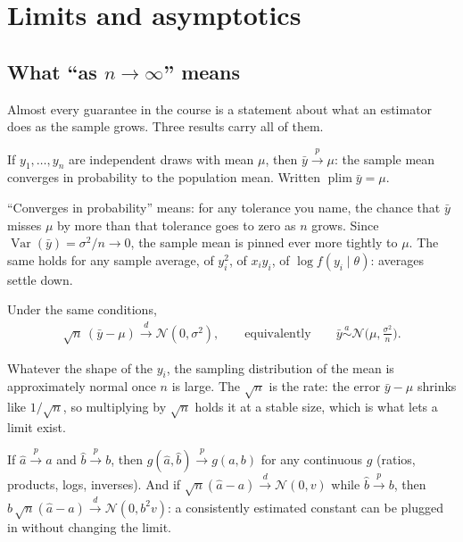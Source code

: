 \documentclass[11pt]{article}
\theoremstyle{definition}
\DeclareMathOperator{\Var}{Var}
\DeclareMathOperator{\plim}{plim}
\newcommand{\dto}{\overset{d}{\longrightarrow}}
\newcommand{\pto}{\overset{p}{\longrightarrow}}
\begin{document}
\section{Limits and asymptotics}
\label{sec:asymp}

\subsection{What ``as $n \to \infty$'' means}

Almost every guarantee in the course is a statement about what an
estimator does as the sample grows. Three results carry all of them.

\begin{rulebox}
If $y_1, \dots, y_n$ are independent draws with mean $\mu$, then
$\bar y \pto \mu$: the sample mean converges in probability to the
population mean. Written $\plim \bar y = \mu$.
\end{rulebox}
``Converges in probability'' means: for any tolerance you name, the chance
that $\bar y$ misses $\mu$ by more than that tolerance goes to zero as $n$
grows. Since $\Var(\bar y) = \sigma^2/n \to 0$, the sample mean is pinned
ever more tightly to $\mu$. The same holds for any sample average, of
$y_i^2$, of $x_iy_i$, of $\log f(y_i \mid \theta)$: averages settle down.

\begin{rulebox}
Under the same conditions,
\begin{align*}
  \sqrt n\,(\bar y - \mu) \dto \mathcal N(0, \sigma^2),
  \qquad\text{equivalently}\qquad
  \bar y \overset{a}{\sim} \mathcal N\!\Big(\mu, \frac{\sigma^2}{n}\Big).
\end{align*}
\end{rulebox}
Whatever the shape of the $y_i$, the sampling distribution of the mean is
approximately normal once $n$ is large. The $\sqrt n$ is the rate: the
error $\bar y - \mu$ shrinks like $1/\sqrt n$, so multiplying by $\sqrt n$
holds it at a stable size, which is what lets a limit exist.

\begin{rulebox}
If $\hat a \pto a$ and $\hat b \pto b$, then $g(\hat a, \hat b) \pto g(a,
b)$ for any continuous $g$ (ratios, products, logs, inverses). And if
$\sqrt n(\hat a - a) \dto \mathcal N(0, v)$ while $\hat b \pto b$, then
$\hat b\,\sqrt n(\hat a - a) \dto \mathcal N(0, b^2 v)$: a consistently
estimated constant can be plugged in without changing the limit.
\end{rulebox}
\end{document}
